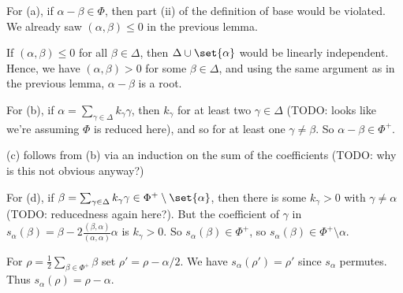 For (a), if  $\alpha - \beta \in \Phi$, then part (ii) of the definition of base
would be violated. We already saw $(\alpha, \beta) \leq 0$ in the previous lemma.

If $(\alpha, \beta)\leq 0 $ for all $\beta \in \Delta$, then $\Delta \cup \set{\alpha}$
would be linearly independent. Hence, we have $(\alpha, \beta) > 0$ for
some $\beta \in \Delta$, and using the same argument as in the previous
lemma, $\alpha - \beta$ is a root.

For (b), if $\alpha = \sum_{\gamma \in \Delta} k_{\gamma}\gamma$, then $k_\gamma$ for
at least two $\gamma \in \Delta$ (TODO: looks like we're assuming $\Phi$ is
reduced here), and so for at least one $\gamma \neq \beta$. So
$\alpha - \beta \in \Phi^+$.

(c) follows from (b) via an induction on the sum of the coefficients
(TODO: why is this not obvious anyway?)

For (d), if $\beta = \sum_{\gamma \in\Delta} k_{\gamma}\gamma \in \Phi^+\setminus\set{\alpha}$,
then there is some $k_\gamma > 0$ with $\gamma\neq \alpha$ (TODO: reducedness again
here?). But the coefficient of $\gamma$ in $s_\alpha(\beta) = \beta - 2\frac{(\beta, \alpha)}{(\alpha, \alpha)}\alpha$
is $k_\gamma >0$. So $s_\alpha(\beta) \in \Phi^+$, so $s_\alpha(\beta) \in \Phi^+\setminus{\alpha}$.

For $\rho = \frac{1}{2}\sum_{\beta \in \Phi^+}\beta$ set $\rho' = \rho - \alpha/2$.
We have $s_\alpha(\rho') = \rho'$ since $s_\alpha$ permutes. Thus
$s_\alpha(\rho) = \rho - \alpha$.
